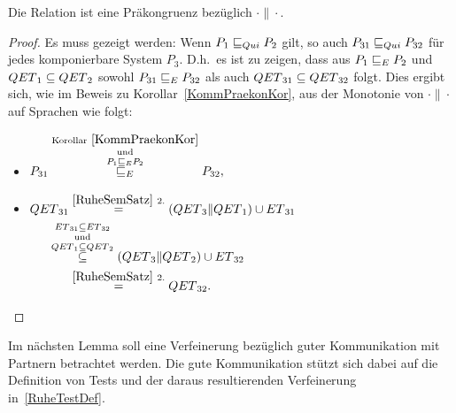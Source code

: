 \begin{Kor}
  \label{RuhePraekonKor}
  Die Relation \QRel{} ist eine Präkongruenz bezüglich $\cdot\|\cdot$.
\end{Kor}
\begin{proof}
  Es muss gezeigt werden: Wenn $P_1 \sqsubseteq  _{Qui} P_2$ gilt, so auch $P_{31} \sqsubseteq  _{Qui}
  P_{32}$ für jedes komponierbare System $P_3$. D.h.\ es ist zu zeigen, dass
  aus $P_1 \sqsubseteq  _E P_2$ und $QET{}_1\subseteq QET{}_2$ sowohl $P_{31} \sqsubseteq  _E
  P_{32}$ als auch $QET{}_{31}\subseteq QET{}_{32}$ folgt. Dies ergibt sich,
  wie im Beweis zu Korollar~\ref{KommPraekonKor}, aus der Monotonie von
  $\cdot\|\cdot$ auf Sprachen wie folgt:
  \begin{itemize}
    \item $\begin{aligned}[t]
        P_{31} \overset{\mathrm{Korollar}~\ref{KommPraekonKor}}{
          \overset{\mathrm{und}}{\overset{P_1 \sqsubseteq  _E P_2}{ \sqsubseteq  _E}}}
        P_{32},
    \end{aligned}$
    \item $\begin{aligned}[t]
        \QET{}_{31} &\overset{\ref{RuheSemSatz}~2.}{=}
        (\QET{}_3\|\QET{}_1)\cup \ET{}_{31}\\
        &\hspace{-0.6cm}\overset{\ET{}_{31}\subseteq
      \ET{}_{32}}{\overset{\mathrm{und}}{\overset{\QET{}_1\subseteq
      \QET{}_2}{\subseteq}}} (\QET{}_3\|\QET{}_2) \cup \ET{}_{32}\\
        &\overset{\ref{RuheSemSatz}~2.}{=} \QET{}_{32}.
    \end{aligned}$
  \vspace*{-0.7cm}
  \end{itemize}
\end{proof}

Im nächsten Lemma soll eine Verfeinerung bezüglich guter Kommunikation mit
Partnern betrachtet werden. Die gute Kommunikation stützt sich dabei auf die
Definition von Tests und der daraus resultierenden Verfeinerung
in~\ref{RuheTestDef}.

